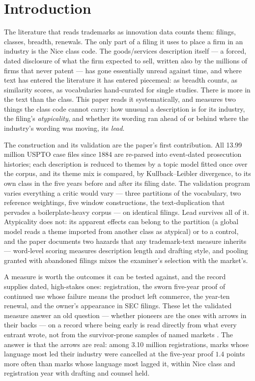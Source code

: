\section{Introduction}\label{sec:intro}

The literature that reads trademarks as innovation data counts them:
filings, classes, breadth, renewals. The only part of a filing it uses to
place a firm in an industry is the Nice class code. The goods/services
description itself --- a forced, dated disclosure of what the firm
expected to sell, written also by the millions of firms that never patent
--- has gone essentially unread against time, and where text has entered
the literature it has entered piecemeal: as breadth counts, as similarity
scores, as vocabularies hand-curated for single studies. There is more in
the text than the class. This paper reads it systematically, and measures
two things the class code cannot carry: how unusual a description is for
its industry, the filing's \emph{atypicality}, and whether its wording ran
ahead of or behind where the industry's wording was moving, its
\emph{lead}.

The construction and its validation are the paper's first contribution.
All 13.99 million USPTO case files since 1884 are re-parsed into
event-dated prosecution histories; each description is reduced to themes
by a topic model fitted once over the corpus, and its theme mix is
compared, by Kullback--Leibler divergence, to its own class in the five
years before and after its filing date. The validation program varies
everything a critic would vary --- three partitions of the vocabulary,
two reference weightings, five window constructions, the text-duplication
that pervades a boilerplate-heavy corpus --- on identical filings. Lead
survives all of it. Atypicality does not: its apparent effects can belong
to the partition (a global model reads a theme imported from another
class as atypical) or to a control, and the paper documents two hazards
that any trademark-text measure inherits --- word-level scoring measures
description length and drafting style, and pooling granted with abandoned
filings mixes the examiner's selection with the market's.

A measure is worth the outcomes it can be tested against, and the record
supplies dated, high-stakes ones: registration, the sworn five-year proof
of continued use whose failure means the product left commerce, the
year-ten renewal, and the owner's appearance in SEC filings. These let
the validated measure answer an old question --- whether pioneers are the
ones with arrows in their backs --- on a record where being early is read
directly from what every entrant wrote, not from the survivor-prone
samples of named markets \citep{GolderTellis1993, SemadeniAnderson2010}.
The answer is that the arrows are real: among 3.10 million registrations,
marks whose language most led their industry were cancelled at the
five-year proof $1.4$ points more often than marks whose language most
lagged it, within Nice class and registration year with drafting and
counsel held.

